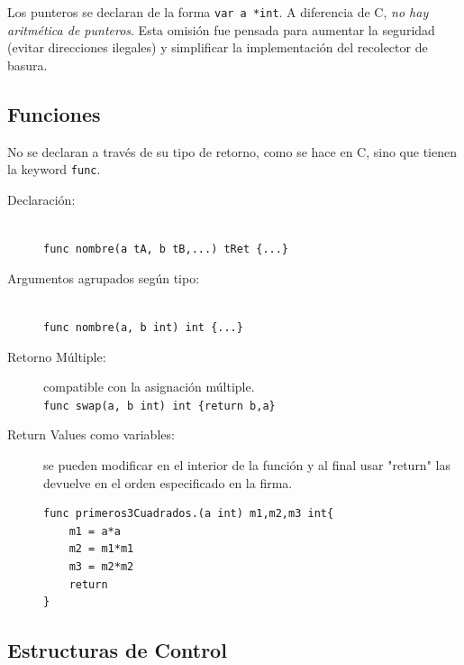 \documentclass{article}
\begin{document}
Los punteros se declaran de la forma \lstinline|var a *int|. A diferencia de C, \emph{no hay aritmética de punteros}. Esta omisión fue pensada para aumentar la seguridad (evitar direcciones ilegales) y simplificar la implementación del recolector de basura.\cite{pa}

\subsection{Funciones}
No se declaran a través de su tipo de retorno, como se hace en C, sino que tienen la keyword \lstinline|func|.
\begin{description}
	\item[Declaración:]\hfill \\
		\lstinline|func nombre(a tA, b tB,...) tRet {...}| 
	\item[Argumentos agrupados según tipo:] \hfill \\
		\lstinline|func nombre(a, b int) int {...}|
	\item[Retorno Múltiple:] compatible con la asignación múltiple. \\
		\lstinline|func swap(a, b int) int {return b,a}|
	\item[Return Values como variables:] se pueden modificar en el interior de la función y al final usar "return" las devuelve en el orden especificado en la firma.
\begin{lstlisting}[caption = una variable elevada al cuadrado 3 veces]
func primeros3Cuadrados.(a int) m1,m2,m3 int{
	m1 = a*a
	m2 = m1*m1
	m3 = m2*m2
	return
}
\end{lstlisting}
\end{description}

\subsection{Estructuras de Control}
\end{document}
